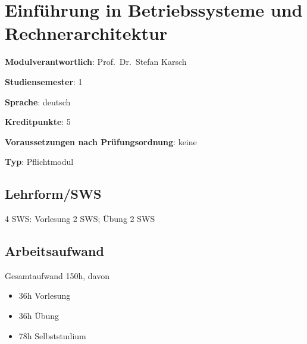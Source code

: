 \chapter{Einführung in Betriebssysteme und
Rechnerarchitektur\label{/mi-2017/modulbeschreibungen-bachelor/BA_EinfhrunginBetriebssystemeundRechnerarchitektur}}\label{einfuxfchrung-in-betriebssysteme-und-rechnerarchitekturpathlabelmi-2017modulbeschreibungen-bachelorbaux5feinfhrunginbetriebssystemeundrechnerarchitektur}

\begin{modulHead}
\textbf{Modulverantwortlich}: Prof.~Dr.~Stefan
Karsch
\end{modulHead}
\begin{modulHead}
\textbf{Studiensemester}:
1
\end{modulHead}
\begin{modulHead}
\textbf{Sprache}:
deutsch
\end{modulHead}
\begin{modulHead}
\textbf{Kreditpunkte}:
5
\end{modulHead}
\begin{modulHead}
\textbf{Voraussetzungen nach
Prüfungsordnung}: keine
\end{modulHead}
\begin{modulHead}
\textbf{Typ}:
Pflichtmodul
\end{modulHead}


\section*{Lehrform/SWS\label{/mi-2017/modulbeschreibungen-bachelor/BA_EinfhrunginBetriebssystemeundRechnerarchitektur}}\label{lehrformswspathlabelmi-2017modulbeschreibungen-bachelorbaux5feinfhrunginbetriebssystemeundrechnerarchitektur}

4 SWS: Vorlesung 2 SWS; Übung 2 SWS

\section*{Arbeitsaufwand\label{/mi-2017/modulbeschreibungen-bachelor/BA_EinfhrunginBetriebssystemeundRechnerarchitektur}}\label{arbeitsaufwandpathlabelmi-2017modulbeschreibungen-bachelorbaux5feinfhrunginbetriebssystemeundrechnerarchitektur}

Gesamtaufwand 150h, davon

\begin{itemize}
\tightlist
\item
  36h Vorlesung
\item
  36h Übung
\item
  78h Selbststudium
\end{itemize}

